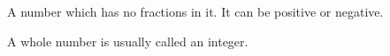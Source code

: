 A number which has no fractions in it.
It can be positive or negative.
\par
A whole number is usually called an integer.